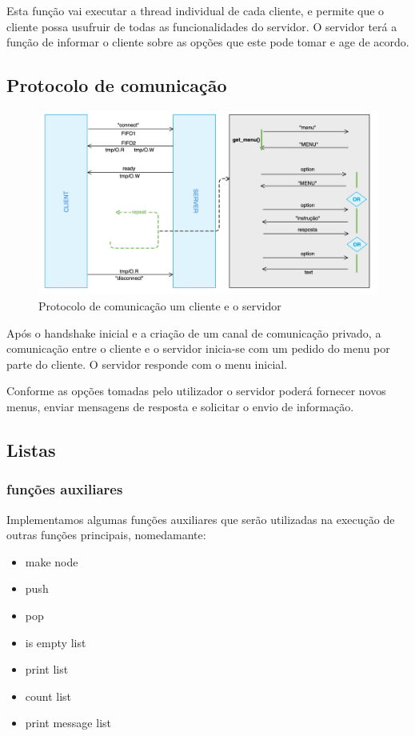 \documentclass{article}
\begin{document}
Esta função vai executar a thread individual de cada cliente, e permite que o cliente possa usufruir de todas as funcionalidades do servidor.
O servidor terá a função de informar o cliente sobre as opções que este pode tomar e age de acordo.

\subsection{Protocolo de comunicação}
\label{sec:org911493c}

\begin{figure}[htbp]
\centering
\includegraphics[width=.9\linewidth]{./img/protocol.jpeg}
\caption{\label{fig:protocol}
Protocolo de comunicação um cliente e o servidor}
\end{figure}

Após o handshake inicial e a criação de um canal de comunicação privado, a comunicação entre o cliente e o servidor inicia-se com um pedido do menu por parte do cliente.
O servidor responde com o menu inicial.

Conforme as opções tomadas pelo utilizador o servidor poderá fornecer novos menus, enviar mensagens de resposta e solicitar o envio de informação.

\subsection{Listas}
\label{sec:orga06e493}

\subsubsection{funções auxiliares}
\label{sec:org57526e5}

Implementamos algumas funções auxiliares que serão utilizadas na execução de outras funções principais, nomedamante:
\begin{itemize}
\item make node
\item push
\item pop
\item is empty list
\item print list
\item count list
\item print message list
\end{itemize}
\end{document}
